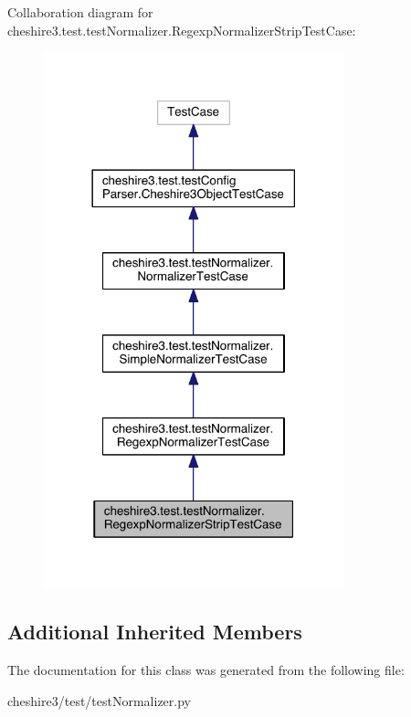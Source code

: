 Collaboration diagram for cheshire3.\-test.\-test\-Normalizer.\-Regexp\-Normalizer\-Strip\-Test\-Case\-:
\nopagebreak
\begin{figure}[H]
\begin{center}
\leavevmode
\includegraphics[width=246pt]{classcheshire3_1_1test_1_1test_normalizer_1_1_regexp_normalizer_strip_test_case__coll__graph}
\end{center}
\end{figure}
\subsection*{Additional Inherited Members}


The documentation for this class was generated from the following file\-:\begin{DoxyCompactItemize}
\item 
cheshire3/test/test\-Normalizer.\-py\end{DoxyCompactItemize}
